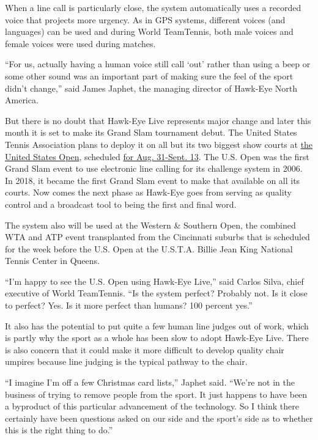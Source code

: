When a line call is particularly close, the system automatically uses a
recorded voice that projects more urgency. As in GPS systems, different
voices (and languages) can be used and during World TeamTennis, both
male voices and female voices were used during matches.

``For us, actually having a human voice still call `out' rather than
using a beep or some other sound was an important part of making sure
the feel of the sport didn't change,'' said James Japhet, the managing
director of Hawk-Eye North America.

But there is no doubt that Hawk-Eye Live represents major change and
later this month it is set to make its Grand Slam tournament debut. The
United States Tennis Association plans to deploy it on all but its two
biggest show courts at
\href{https://www.nytimes.com/2020/06/15/sports/tennis/us-open.html}{the
United States Open}, scheduled
\href{https://www.nytimes.com/2020/06/16/sports/us-open-tennis-cuomo.html}{for
Aug. 31-Sept. 13}. The U.S. Open was the first Grand Slam event to use
electronic line calling for its challenge system in 2006. In 2018, it
became the first Grand Slam event to make that available on all its
courts. Now comes the next phase as Hawk-Eye goes from serving as
quality control and a broadcast tool to being the first and final word.

The system also will be used at the Western \& Southern Open, the
combined WTA and ATP event transplanted from the Cincinnati suburbs that
is scheduled for the week before the U.S. Open at the U.S.T.A. Billie
Jean King National Tennis Center in Queens.

``I'm happy to see the U.S. Open using Hawk-Eye Live,'' said Carlos
Silva, chief executive of World TeamTennis. ``Is the system perfect?
Probably not. Is it close to perfect? Yes. Is it more perfect than
humans? 100 percent yes.''

It also has the potential to put quite a few human line judges out of
work, which is partly why the sport as a whole has been slow to adopt
Hawk-Eye Live. There is also concern that it could make it more
difficult to develop quality chair umpires because line judging is the
typical pathway to the chair.

``I imagine I'm off a few Christmas card lists,'' Japhet said. ``We're
not in the business of trying to remove people from the sport. It just
happens to have been a byproduct of this particular advancement of the
technology. So I think there certainly have been questions asked on our
side and the sport's side as to whether this is the right thing to do.''


